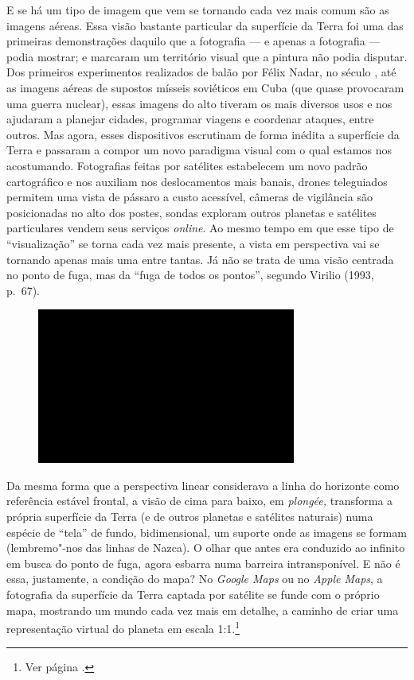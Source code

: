E se há um tipo de imagem que vem se tornando cada vez mais comum são as
imagens aéreas. Essa visão bastante particular da superfície da Terra
foi uma das primeiras demonstrações daquilo que a fotografia --- e apenas
a fotografia --- podia mostrar; e marcaram um território visual que a
pintura não podia disputar. Dos primeiros experimentos realizados de
balão por Félix Nadar, no século , até as imagens aéreas de supostos
mísseis soviéticos em Cuba (que quase provocaram uma guerra nuclear),
essas imagens do alto tiveram os mais diversos usos e nos ajudaram a
planejar cidades, programar viagens e coordenar ataques, entre outros.
Mas agora, esses dispositivos escrutinam de forma inédita a superfície
da Terra e passaram a
compor um novo paradigma visual com o qual estamos nos acostumando.
Fotografias feitas por satélites estabelecem um novo padrão cartográfico
e nos auxiliam nos deslocamentos mais banais, drones teleguiados
permitem uma vista de pássaro a custo acessível, câmeras de vigilância
são posicionadas no alto dos postes, sondas exploram outros planetas e
satélites particulares vendem seus serviços \emph{online}. Ao mesmo
tempo em que esse tipo de ``visualização'' se torna cada vez mais
presente, a vista em perspectiva vai se tornando apenas mais uma entre
tantas. Já não se trata de uma visão centrada no ponto de fuga, mas da
``fuga de todos os pontos'', segundo Virilio (1993, p.~67).

\begin{figure}[!ht]

\centering
 \includegraphics[width=85mm]{./imgs/im1.jpg}
\caption{\tiny{}}

\end{figure}

Da mesma forma que a perspectiva linear considerava a linha do horizonte
como referência estável frontal, a visão de cima para baixo, em
\emph{plongée,} transforma a própria superfície da Terra (e de outros
planetas e satélites naturais) numa espécie de ``tela'' de fundo,
bidimensional, um suporte onde as imagens se formam (lembremo"-nos das
linhas de Nazca). O olhar que antes era conduzido ao infinito em busca
do ponto de fuga, agora esbarra numa barreira intransponível. E não é
essa, justamente, a condição do mapa? No \emph{Google Maps} ou no
\emph{Apple Maps}, a fotografia da superfície da Terra captada por
satélite se funde com o próprio mapa, mostrando um mundo cada vez mais
em detalhe, a caminho de criar uma representação virtual do planeta em
escala 1:1.\footnote{Ver página \pageref{escala}.}

